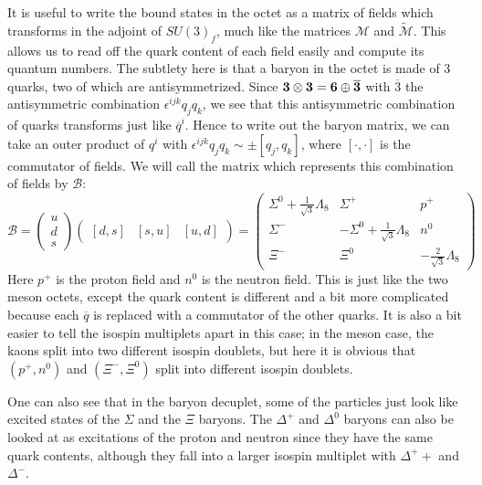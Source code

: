 \documentclass[11pt, oneside]{article}   	%
\theoremstyle{definition}
\numberwithin{equation}{subsection}		%
\begin{document}
It is useful to write the bound states in the octet as a matrix of fields which transforms in the adjoint of $SU(3)_f$, much like the matrices 
$\mathcal M$ and $\tilde{\mathcal{M}}$. This allows us to read off the quark content of each field easily and compute its quantum numbers. 
The subtlety here is that a baryon in the octet is made of 3 quarks, two of which are antisymmetrized. Since $\bf 3\otimes 3 = 6\oplus\overline 3$ with 
$\overline 3$ the antisymmetric combination $\epsilon^{ijk}q_j q_k$, we see that this antisymmetric combination of quarks transforms just like $\overline q^i$. 
Hence to write out the baryon matrix, we can take an outer product of $q^i$ with $\epsilon^{ijk} q_j q_k\sim\pm [q_j, q_k]$, where $[\cdot, \cdot]$ is the 
commutator of fields. We will call the matrix which represents this combination of fields by $\mathcal B$:
\begin{equation}
	\mathcal B = \begin{pmatrix} u \\ d \\ s \end{pmatrix} \begin{pmatrix} [d, s] & [s, u] & [u, d] \end{pmatrix} = 
	\begin{pmatrix} \Sigma^0 + \frac{1}{\sqrt 3}\Lambda_8 & \Sigma^+ & p^+ \\ \Sigma^- & -\Sigma^0 + \frac{1}{\sqrt 3}\Lambda_8 & n^0 \\ \Xi^- & \Xi^0 & -\frac{2}{\sqrt 3}\Lambda_8
	\end{pmatrix}
\end{equation}
Here $p^+$ is the proton field and $n^0$ is the neutron field. This is just like the two meson octets, except the quark content is different and a bit 
more complicated because each $\overline q$ is replaced with a commutator of the other quarks. It is also a bit easier to tell the isospin multiplets 
apart in this case; in the meson case, the kaons split into two different isospin doublets, but here it is obvious that $(p^+, n^0)$ and $(\Xi^-, \Xi^0)$ split 
into different isospin doublets. 

One can also see that in the baryon decuplet, some of the particles just look like excited states of the $\Sigma$ and the $\Xi$ baryons. 
The $\Delta^+$ and $\Delta^0$ baryons can also be looked at as excitations of the proton and neutron since they have the same quark 
contents, although they fall into a larger isospin multiplet with $\Delta^++$ and $\Delta^-$. 
\end{document}
